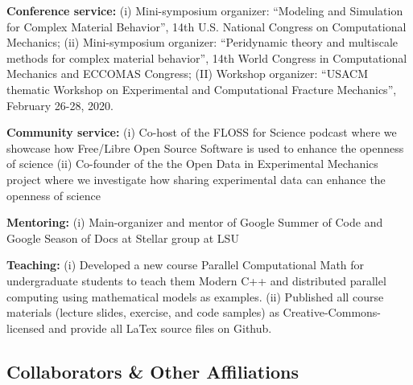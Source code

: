 \documentclass[svgnames,11pt]{article}
\begin{document}
\begin{bibenum}[itemsep=4pt]

    \item \textbf{Conference service:}
        (i) Mini-symposium organizer: ``Modeling and Simulation for Complex Material Behavior'', 14th U.S. National Congress on Computational Mechanics; (ii)  Mini-symposium organizer: ``Peridynamic theory and multiscale methods for complex material behavior'', 14th World Congress in Computational Mechanics and ECCOMAS Congress; (II) Workshop organizer: ``USACM thematic Workshop on Experimental and Computational Fracture Mechanics'', February 26-28, 2020.

 

    \item \textbf{Community service:}
        (i) Co-host of the FLOSS for Science podcast where we showcase how Free/Libre Open Source Software is used to enhance the openness of science
        (ii) Co-founder of the the Open Data in Experimental Mechanics project where we investigate how sharing experimental data can enhance the openness of science


    \item \textbf{Mentoring:}
        (i) Main-organizer and mentor of Google Summer of Code and Google Season of Docs at Stellar group at LSU
    \item \textbf{Teaching:}
    (i) Developed a new course Parallel Computational Math for undergraduate students to teach them Modern C++ and distributed parallel computing using mathematical models as examples. (ii) Published all course materials (lecture slides, exercise, and code samples) as Creative-Commons-licensed and provide all LaTex source files on Github.   
\end{bibenum}

\subsection{Collaborators \& Other Affiliations}
\end{document}
